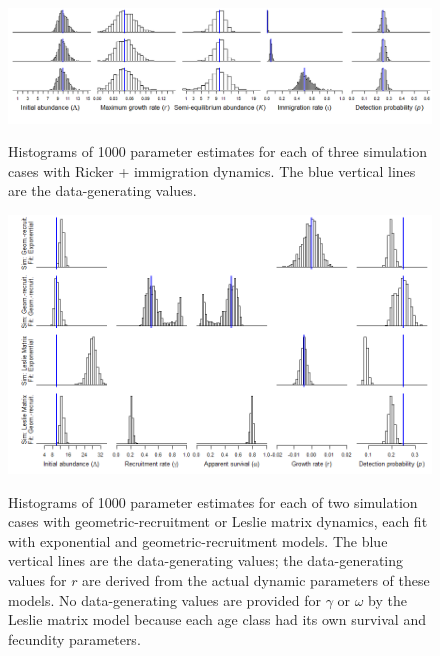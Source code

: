 \documentclass{article}
\begin{document}
\begin{figure}
\caption{Histograms of 1000 parameter estimates for each of three
simulation cases with Ricker + immigration dynamics. The blue vertical lines are the 
data-generating values.}
  \centering
  \includegraphics[width=8.5in]{../figs/ricki_hists}
\label{fig:ricki_hists}
\end{figure}

\begin{figure}
\caption{Histograms of 1000 parameter estimates for each of two
simulation cases with geometric-recruitment or Leslie matrix dynamics, each fit with 
exponential and geometric-recruitment models. The blue vertical lines are the 
data-generating values; the data-generating values for $r$ are derived from
the actual dynamic parameters of these models.  No data-generating values
are provided for $\gamma$ or $\omega$ by the Leslie matrix model because
each age class had its own survival and fecundity parameters.}
  \centering
  \includegraphics{../figs/geom_mat_hists}
\label{fig:geom_mat_hists}
\end{figure}
\end{document}
